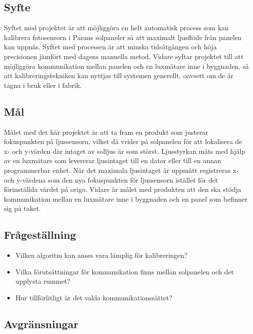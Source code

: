     \subsection{Syfte} %
    \label{sub:syfte}
          Syftet med projektet är att möjliggöra en helt automatisk process som kan kalibrera fotosensorn i Parans solpaneler så att maximalt ljusflöde från panelen kan uppnås. Syftet med processen är att minska tidsåtgången och höja precisionen jämfört med dagens manuella metod. 
          Vidare syftar projektet till att möjliggöra kommunikation mellan panelen och en luxmätare inne i byggnaden, så att kalibreringstekniken kan nyttjas till systemen generellt, oavsett om de är tagna i bruk eller i fabrik.

    \subsection{Mål} %
    \label{sub:mal}
        Målet med det här projektet är att ta fram en produkt som justerar fokuspunkten på ljussensorn, vilket då vrider på solpanelen för att lokalisera de x- och y-värden där intaget av solljus är som störst. 
        Ljusstyrkan mäts med hjälp av en luxmätare som levererar ljusintaget till en dator eller till en annan programmerbar enhet. 
        När det maximala ljusintaget är uppmätt registreras x- och y-värdena som den nya fokuspunkten för ljussensorn istället för det förinställda värdet på origo. 
        Vidare är målet med produkten att den ska stödja kommunikation mellan en luxmätare inne i byggnaden och en panel som befinner sig på taket. 


    \subsection{Frågeställning} %
    \label{sub:fragestallning}
        \begin{itemize}
            \item Vilken algoritm kan anses vara lämplig för kalibreringen?
            \item Vilka förutsättningar för kommunikation finns mellan solpanelen och det upplysta rummet? 
            \item Hur tillförlitligt är det valda kommunikationssättet? 
            
        \end{itemize}

    \subsection{Avgränsningar} %
    \label{sub:avgr_nsningar}
